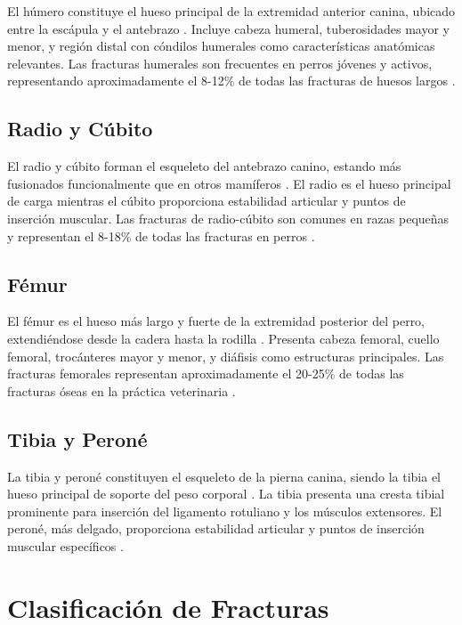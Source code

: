 {El húmero constituye el hueso principal de la extremidad anterior canina, ubicado entre la escápula y el antebrazo \cite{hermanson2019millers}. Incluye cabeza humeral, tuberosidades mayor y menor, y región distal con cóndilos humerales como características anatómicas relevantes. Las fracturas humerales son frecuentes en perros jóvenes y activos, representando aproximadamente el 8-12\% de todas las fracturas de huesos largos \cite{fossum2021small}.

\subsection{Radio y Cúbito}

El radio y cúbito forman el esqueleto del antebrazo canino, estando más fusionados funcionalmente que en otros mamíferos \cite{dyce2012anatomia}. El radio es el hueso principal de carga mientras el cúbito proporciona estabilidad articular y puntos de inserción muscular. Las fracturas de radio-cúbito son comunes en razas pequeñas y representan el 8-18\% de todas las fracturas en perros \cite{johnson2018fundamentals}.

\subsection{Fémur}

El fémur es el hueso más largo y fuerte de la extremidad posterior del perro, extendiéndose desde la cadera hasta la rodilla \cite{hermanson2019millers}. Presenta cabeza femoral, cuello femoral, trocánteres mayor y menor, y diáfisis como estructuras principales. Las fracturas femorales representan aproximadamente el 20-25\% de todas las fracturas óseas en la práctica veterinaria \cite{piermattei2016handbook}.

\subsection{Tibia y Peroné}

La tibia y peroné constituyen el esqueleto de la pierna canina, siendo la tibia el hueso principal de soporte del peso corporal \cite{hermanson2019millers}. La tibia presenta una cresta tibial prominente para inserción del ligamento rotuliano y los músculos extensores. El peroné, más delgado, proporciona estabilidad articular y puntos de inserción muscular específicos \cite{tobias2017veterinary}.

\section{Clasificación de Fracturas}

}
